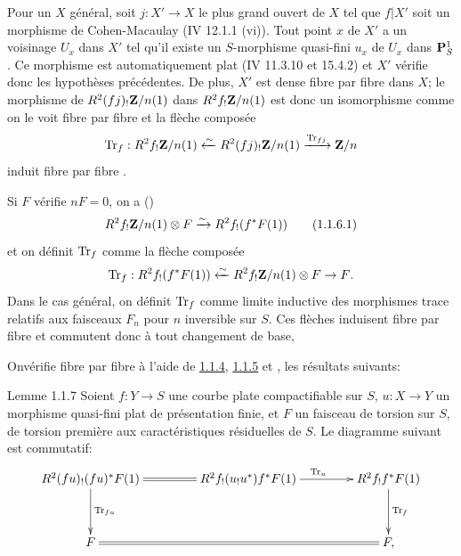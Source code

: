 \documentclass[10pt]{../fichiers-configuration-latex/smfart}
\begin{document}
Pour un $X$ général, soit $j:X'\rightarrow X$ le plus grand ouvert de
$X$ tel que $f|X'$ soit un morphisme de Cohen-Macaulay (\cf \EGA IV
12.1.1 (vi)). Tout point $x$ de $X'$ a un voisinage $U_{x}$ dans $X'$
tel qu'il existe un $S$-morphisme quasi-fini $u_{x}$ de $U_{x}$ dans
$\mathbf{P}^{1}_{S}$. Ce morphisme est automatiquement plat (\EGA IV
11.3.10 et 15.4.2) et $X'$ vérifie donc les hypothèses précédentes. De
plus, $X'$ est dense fibre par fibre dans $X$; le morphisme de
$R^{2}(fj)_{!}\mathbf{Z}/n(1)$ dans $R^{2}f_{!}\mathbf{Z}/n(1)$ est
donc un isomorphisme comme on le voit fibre par fibre et la flèche
composée
$$
\operatorname{Tr}_{f}:R^{2}f_{!}\mathbf{Z}/n(1)\xleftarrow{\sim}
R^{2}(fj)_{!}\mathbf{Z}/n(1)\xrightarrow{\operatorname{Tr}_{fj}}\mathbf{Z}/n
$$
induit fibre par fibre .

Si $F$ vérifie $nF=0$, on a ()
\begin{equation*}
R^{2}f_{!}\mathbf{Z}/n(1)\otimes F\xrightarrow{\sim}
R^{2}f_{!}(f^{\ast}F(1))\tag{1.1.6.1} 
\end{equation*}%
et on définit $\operatorname{Tr}_{f}$ comme la flèche composée
$$
\operatorname{Tr}_{f}:R^{2}f_{!}(f^{\ast}F(1))\xleftarrow{\sim}
R^{2}f_{!}\mathbf{Z}/n(1) \otimes F\rightarrow F{}.
$$
Dans le cas général, on définit $\operatorname{Tr}_{f}$ comme limite inductive des
morphismes trace relatifs aux faisceaux $F_n$ pour $n$ inversible
sur $S$. Ces flèches induisent fibre par fibre  et commutent
donc à tout changement de base, \cqfd

On\pageoriginale vérifie fibre par fibre à l'aide de
\hyperref[XVIII.lem1.1.4]{1.1.4}, \hyperref[XVIII.lem1.1.5]{1.1.5} et , les
résultats suivants:

\begin{enonce*}{Lemme 1.1.7}
Soient $f:Y\rightarrow S$ une courbe plate compactifiable sur $S$,
$u:X\rightarrow Y$ un morphisme quasi-fini plat de présentation finie,
et $F$ un faisceau de torsion sur $S$, de torsion première aux
caractéristiques résiduelles de $S$. Le diagramme suivant est
commutatif:
$$
\xymatrix@C=1.5cm@R=1.25cm{
R^2(fu)_! (fu)^{\ast}F(1) \ar[d]^{\Tr_{fu}}\ar@{=}[r]& R^2f_!(u_!
u^{\ast})f^{\ast}F(1) \ar[r]^{\Tr_u}& R^2f_!f^{\ast}F(1)\ar[d]^{\Tr_f} \\
F     \ar@{=}[rr] &&  F,
}
$$
\end{enonce*}
\end{document}
